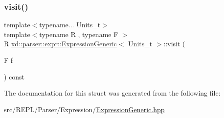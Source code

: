 \mbox{\label{structxd_1_1parser_1_1expr_1_1_expression_generic_aaefa9e6adab7a545be4056068ffc0db3}} 
\subsubsection{\texorpdfstring{visit()}{visit()}\hspace{0.1cm}{\footnotesize\ttfamily [2/2]}}
{\footnotesize\ttfamily template$<$typename... Units\+\_\+t$>$ \\
template$<$typename R , typename F $>$ \\
R \mbox{\hyperlink{structxd_1_1parser_1_1expr_1_1_expression_generic}{xd\+::parser\+::expr\+::\+Expression\+Generic}}$<$ Units\+\_\+t $>$\+::visit (\begin{DoxyParamCaption}\item[{F}]{f }\end{DoxyParamCaption}) const\hspace{0.3cm}{\ttfamily [inline]}}



The documentation for this struct was generated from the following file\+:\begin{DoxyCompactItemize}
\item 
src/\+R\+E\+P\+L/\+Parser/\+Expression/\mbox{\hyperlink{_expression_generic_8hpp}{Expression\+Generic.\+hpp}}\end{DoxyCompactItemize}
